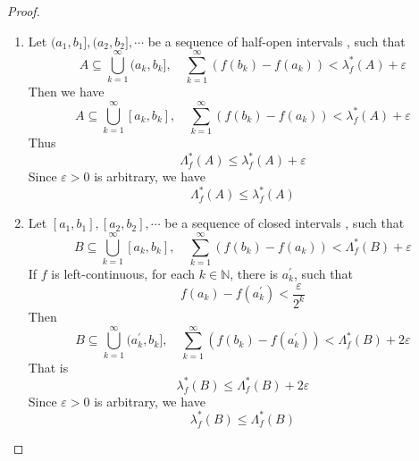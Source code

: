 \documentclass[../main.tex]{subfiles}
\begin{document}
\begin{proof}
    \begin{enumerate}
        \item Let \(  (a_1,b_1],(a_2,b_2],\cdots   \) be a sequence of  half-open intervals , such  that \[
        A\subseteq \bigcup _{k = 1}^{\infty}(a_{k},b_{k}],\quad \sum _{k = 1}^{\infty} (f\left( b_{k} \right)-f\left( a_{k} \right)  ) <  \lambda ^{*}_{f}\left( A \right)+  \varepsilon  
        \]Then we have \[
        A\subseteq \bigcup _{k = 1}^{\infty}\left[ a_{k},b_{k} \right],\quad \sum _{k = 1}^{\infty}\left( f\left( b_{k} \right)-f\left( a_{k} \right)   \right)<  \lambda _{f}^{*}\left( A \right)+  \varepsilon    
        \]    Thus \[
     \Lambda _{f}^{*}\left( A \right) \le  \lambda _{f}^{*}\left( A \right)+  \varepsilon   
        \] Since \(   \varepsilon > 0  \) is arbitrary, we have \[
         \Lambda _{f}^{*}\left( A \right) \le  \lambda _{f}^{*}\left( A \right) 
        \]
        \item   Let \( \left[ a_1,b_1 \right],\left[ a_2,b_2\right],\cdots      \) be a sequence of closed intervals , such that \[
        B\subseteq \bigcup _{k = 1}^{\infty}\left[ a_{k},b_{k} \right],\quad \sum _{k = 1}^{\infty}\left( f\left( b_{k} \right)-f\left( a_{k} \right)   \right)<  \Lambda _{f}^{*}\left( B \right)+  \varepsilon    
        \] If \(  f   \) is left-continuous, for each \(  k \in \mathbb{N}   \), there is \(  a_{k}^{\prime}   \), such that \[
        f\left( a_{k} \right)-f\left( a_{k}^{\prime}  \right)< \frac{ \varepsilon  }{2^{k} }   
        \] Then \[
        B\subseteq \bigcup _{k = 1}^{\infty}(a_{k}^{\prime} ,b_{k}],\quad \sum _{k = 1}^{\infty}\left( f\left( b_{k} \right)-f\left( a_{k}^{\prime}  \right)   \right)<  \Lambda _{f}^{*}\left( B \right)+  2\varepsilon 
        \]   That is \[
         \lambda _{f}^{*}\left( B \right)\le  \Lambda _{f}^{*}\left( B \right)+ 2 \varepsilon   
        \] Since \(   \varepsilon > 0  \) is arbitrary, we have \[
         \lambda _{f}^{*}\left( B \right)\le  \Lambda _{f}^{*}\left( B \right)  
        \] 
    \end{enumerate}
    
\end{proof}
\end{document}
